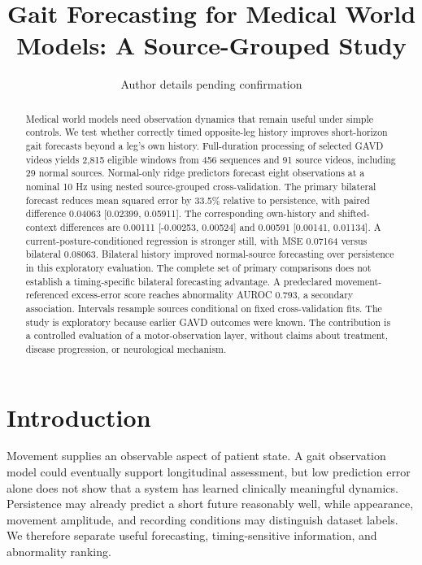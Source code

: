 \documentclass[letterpaper]{article}
\title{Gait Forecasting for Medical World Models: A Source-Grouped Study}
\author{Author details pending confirmation}
\begin{document}
\maketitle

\begin{abstract}

Medical world models need observation dynamics that remain useful under simple controls. We test whether correctly timed opposite-leg history improves short-horizon gait forecasts beyond a leg's own history. Full-duration processing of selected GAVD videos yields 2,815 eligible windows from 456 sequences and 91 source videos, including 29 normal sources. Normal-only ridge predictors forecast eight observations at a nominal 10 Hz using nested source-grouped cross-validation. The primary bilateral forecast reduces mean squared error by 33.5\% relative to persistence, with paired difference 0.04063 [0.02399, 0.05911]. The corresponding own-history and shifted-context differences are 0.00111 [-0.00253, 0.00524] and 0.00591 [0.00141, 0.01134]. A current-posture-conditioned regression is stronger still, with MSE 0.07164 versus bilateral 0.08063. Bilateral history improved normal-source forecasting over persistence in this exploratory evaluation. The complete set of primary comparisons does not establish a timing-specific bilateral forecasting advantage. A predeclared movement-referenced excess-error score reaches abnormality AUROC 0.793, a secondary association. Intervals resample sources conditional on fixed cross-validation fits. The study is exploratory because earlier GAVD outcomes were known. The contribution is a controlled evaluation of a motor-observation layer, without claims about treatment, disease progression, or neurological mechanism.

\end{abstract}

\section{Introduction}

Movement supplies an observable aspect of patient state. A gait observation model could eventually support longitudinal assessment, but low prediction error alone does not show that a system has learned clinically meaningful dynamics. Persistence may already predict a short future reasonably well, while appearance, movement amplitude, and recording conditions may distinguish dataset labels. We therefore separate useful forecasting, timing-sensitive information, and abnormality ranking.
\end{document}
